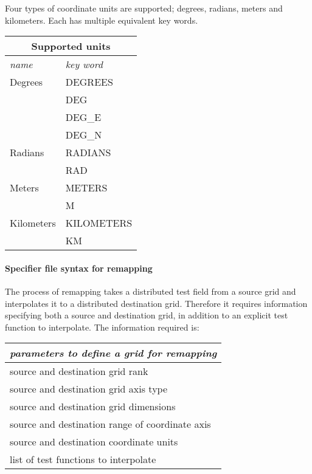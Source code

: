 Four types of coordinate units are supported; degrees, radians, meters and kilometers.  Each has multiple equivalent key words. 
 \begin{center}
\begin{tabular}{| l | l |} 
\multicolumn{2}{c}{ Supported units }  \\
\hline 
{\em name } & {\em key word} \\
\hline \hline
Degrees & DEGREES \\
  & DEG \\
  & DEG\_E \\
  & DEG\_N \\
  \hline
Radians & RADIANS \\
  & RAD \\
  \hline
 Meters & METERS \\
    & M \\
    \hline
   Kilometers & KILOMETERS \\
      & KM \\
\hline 
\end{tabular}
\end{center}


\paragraph{Specifier file syntax for remapping}
The process of remapping takes a distributed test field from a source grid and interpolates it to a distributed destination grid. Therefore it requires information specifying both a source and destination grid, in addition to an explicit test function to interpolate. The information required is:
\begin{center}
\begin{tabular}{| l |} \hline 
{\em parameters to define a grid for remapping }  \\
\hline \hline
 source and destination grid rank    \\
 source and destination grid axis type   \\
 source and destination grid dimensions   \\
 source and destination range of coordinate axis  \\
 source and destination coordinate units \\
 list of test functions to interpolate \\
\hline 
\end{tabular}
\end{center}

